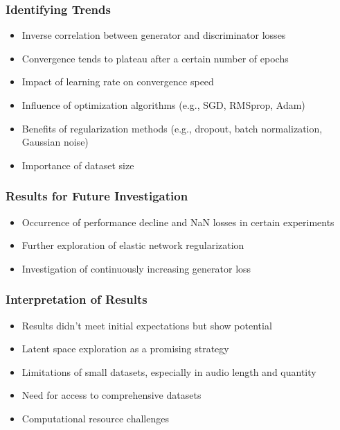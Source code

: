 \begin{frame}
    \frametitle{Identifying Trends}

    \begin{itemize}
        \item Inverse correlation between generator and discriminator losses
        \item Convergence tends to plateau after a certain number of epochs
        \item Impact of learning rate on convergence speed
        \item Influence of optimization algorithms (e.g., SGD, RMSprop, Adam)
        \item Benefits of regularization methods (e.g., dropout, batch normalization, Gaussian noise)
        \item Importance of dataset size
    \end{itemize}

\end{frame}

\begin{frame}
    \frametitle{Results for Future Investigation}

    \begin{itemize}
        \item Occurrence of performance decline and NaN losses in certain experiments
        \item Further exploration of elastic network regularization
        \item Investigation of continuously increasing generator loss
    \end{itemize}

\end{frame}

\begin{frame}
    \frametitle{Interpretation of Results}

    \begin{itemize}
        \item Results didn't meet initial expectations but show potential
        \item Latent space exploration as a promising strategy
        \item Limitations of small datasets, especially in audio length and quantity
        \item Need for access to comprehensive datasets
        \item Computational resource challenges
    \end{itemize}

\end{frame}

